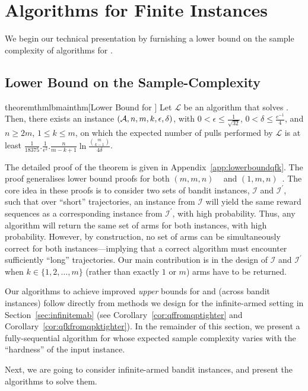 \section{Algorithms for Finite Instances}
\label{sec:finiteinst}

We begin our technical presentation by furnishing a lower bound on the sample complexity of algorithms for \QFK.

\subsection{Lower Bound on the Sample-Complexity}
\label{subsec:lbsckmn}

\begin{restatable}{theorem}{thmlbmainthm}[Lower Bound for \QFK]
\label{thm:lbmainthm}
Let $\mathcal{L}$ be an algorithm that solves \QFK. Then, there exists an 
instance $(\mathcal{A}, n, m, k, \epsilon, \delta)$, 
with $0< \epsilon \leq \frac{1}{\sqrt{32}}$, $0 < \delta \leq \frac{e^{-1}}{4}$, 
and $n \geq 2m$, $1 \leq k \leq m$, on which the expected number of pulls 
performed by $\mathcal{L}$ is at least $\frac{1}{18375}. \frac{1}{\epsilon^2}. \frac{n}{m-k+1}\ln\frac{\binom{m}{k - 1}}{4\delta}$.
\end{restatable}

The detailed proof of the theorem is given in Appendix~\ref{app:lowerboundqfk}. 
The proof generalises lower bound proofs for both $(m, m, n)$
~\citep[see Theorem 8]{bib:lucb} and $(1, m, n)$~\citep[see Theorem 3.3]{bib:arcsk2017}.
The core idea in these proofs is to consider two sets of bandit instances,
$\mathcal{I}$ and $\mathcal{I}^{\prime}$, such that over ``short'' trajectories, 
an instance from $\mathcal{I}$ will yield the same reward sequences as a corresponding 
instance from $\mathcal{I}^{\prime}$, with high probability. Thus, any algorithm 
will return the same set of arms for both instances, with high probability. 
However, by construction, no set of arms can be simultaneously correct for both 
instances---implying that a correct algorithm must encounter sufficiently ``long'' 
trajectories. Our main contribution is in the design of 
$\mathcal{I}$ and $\mathcal{I}^{\prime}$ when $k \in \{1, 2, \dots, m\}$ 
(rather than exactly $1$ or $m$) arms have to be returned.

Our algorithms to achieve improved \textit{upper} bounds for \QF and \QFK 
(across bandit instances) follow directly from methods we design for the 
infinite-armed setting in Section~\ref{sec:infinitemab} (see Corollary~\ref{cor:qffromqptighter} 
and Corollary~\ref{cor:qfkfromqpktighter}). In the remainder of this section, we present a fully-sequential algorithm for \QFK whose expected sample complexity varies with the ``hardness'' of the input instance.

% 

Next, we are going to consider infinite-armed bandit instances, and present the algorithms to solve them.